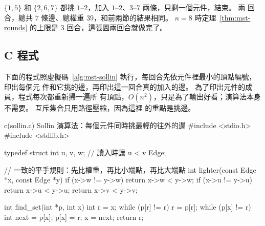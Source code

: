 $\{1, 5\}$ 和 $\{2, 6, 7\}$ 都挑 $1$--$2$，加入 $1$--$2$、$3$--$7$ 兩條，只剩一個元件，結束。 兩
回合，總共 $7$ 條邊、總權重 $39$，和前兩節的結果相同。 $n = 8$ 時定理~\ref{thm:mst-rounds}
的上限是 $3$ 回合，這張圖兩回合就做完了。

\subsection{C 程式}

下面的程式照虛擬碼~\ref{alg:mst-sollin} 執行，每回合先依元件裡最小的頂點編號，印出每個元
件和它挑的邊，再印出這一回合真的加入的邊。 為了印出元件的成員，程式每次都重新掃一遍所
有頂點，$O(n^2)$，只是為了輸出好看；演算法本身不需要。 互斥集合只用路徑壓縮，因為這裡
的重點是挑邊。

\begin{example}[label=ex:mst-sollin]{c}{(sollin.c) Sollin 演算法：每個元件同時挑最輕的往外的邊}
#include <stdio.h>
#include <stdlib.h>

typedef struct {
    int u, v, w;    // 讀入時讓 u < v
} Edge;

// 一致的平手規則：先比權重，再比小端點，再比大端點
int lighter(const Edge *x, const Edge *y)
{
    if (x->w != y->w) {
        return x->w < y->w;
    }
    if (x->u != y->u) {
        return x->u < y->u;
    }
    return x->v < y->v;
}

int find_set(int *p, int x)
{
    int r = x;
    while (p[r] != r) {
        r = p[r];
    }
    while (p[x] != r) {
        int next = p[x];
        p[x] = r;
        x = next;
    }
    return r;
}


\end{example}
